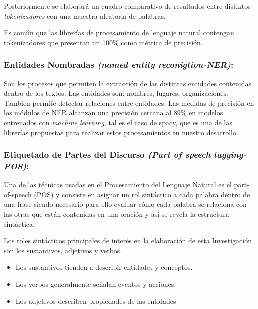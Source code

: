 \documentclass[
  10,
  openany]{book}
\begin{document}
Posteriormente se elaborará un cuadro comparativo de resultados entre distintos \emph{tokenizadores} con una muestra aleatoria de palabras.

Es común que las librerías de procesamiento de lenguaje natural contengan tokenizadores que presentan un 100\% como métrica de precisión.

\hypertarget{ner}{%
\subsubsection{\texorpdfstring{Entidades Nombradas \emph{(named entity reconigtion-NER)}:}{Entidades Nombradas (named entity reconigtion-NER):}}\label{ner}}

Son los procesos que permiten la extracción de las distintas entidades contenidas dentro de los textos. Las entidades son: nombres, lugares, organizaciones. También permite detectar relaciones entre entidades. Las medidas de precisión en los módulos de NER alcanzan una precisión cercana al 89\% en modelos entrenados con \emph{machine learning}, tal es el caso de spacy, que es una de las librerías propuestas para realizar estos procesamientos en nuestro desarrollo.

\hypertarget{pos}{%
\subsubsection{\texorpdfstring{Etiquetado de Partes del Discurso \emph{(Part of speech tagging-POS)}:}{Etiquetado de Partes del Discurso (Part of speech tagging-POS):}}\label{pos}}

Una de las técnicas usadas en el Procesamiento del Lenguaje Natural es el part-of-speech (POS) y consiste en asignar un rol sintáctico a cada palabra dentro de una frase \citep{eisenstein2019} siendo necesario para ello evaluar cómo cada palabra se relaciona con las otras que están contenidas en una oración y así se revela la estructura sintáctica.

Los roles sintácticos principales de interés en la elaboración de esta Investigación son los sustantivos, adjetivos y verbos.

\begin{itemize}
\item
  Los sustantivos tienden a describir entidades y conceptos.
\item
  Los verbos generalmente señalan eventos y acciones.
\item
  Los adjetivos describen propiedades de las entidades
\end{itemize}
\end{document}
